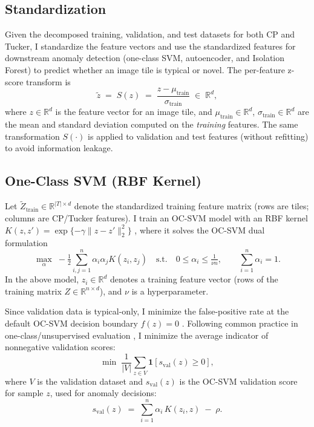 \documentclass[11pt]{article}
\begin{document}
\subsection{Standardization}

Given the decomposed training, validation, and test datasets for both CP and Tucker, I standardize the feature vectors and use the standardized features for downstream anomaly detection (one-class SVM, autoencoder, and Isolation Forest) to predict whether an image tile is typical or novel. The per-feature z-score transform is
\[
\tilde{z} \;=\; S(z) \;=\; \frac{z - \mu_{\text{train}}}{\sigma_{\text{train}}} \;\in\; \mathbb{R}^{d},
\]
where \(z\in\mathbb{R}^{d}\) is the feature vector for an image tile, and \(\mu_{\text{train}}\in\mathbb{R}^{d}\), \(\sigma_{\text{train}}\in\mathbb{R}^{d}\) are the mean and standard deviation computed on the \emph{training} features. The same transformation \(S(\cdot)\) is applied to validation and test features (without refitting) to avoid information leakage.

\subsection{One-Class SVM (RBF Kernel)}

Let \(\tilde{Z}_{\text{train}}\in\mathbb{R}^{|T|\times d}\) denote the standardized training feature matrix (rows are tiles; columns are CP/Tucker features). I train an OC-SVM model with an RBF kernel \(K(z,z')=\exp\{-\gamma\lVert z-z'\rVert_2^2\}\) \citep{Scholkopf2001,TaxDuin2004}, where it solves the OC-SVM dual formulation
\[
\max_{\alpha}\; -\tfrac{1}{2} \sum_{i,j=1}^{n} \alpha_i \alpha_j K(z_i, z_j)
\quad \text{s.t.} \quad
0 \leq \alpha_i \leq \tfrac{1}{\nu n}, \qquad
\sum_{i=1}^{n} \alpha_i = 1.
\]
In the above model, \(z_i \in \mathbb{R}^{d}\) denotes a training feature vector (rows of the training matrix \(Z\in\mathbb{R}^{n\times d}\)), and \(\nu\) is a hyperparameter.

\noindent Since validation data is typical-only, I minimize the false-positive rate at the default OC-SVM decision boundary \(f(z)=0\) \citep{Scholkopf2001,TaxDuin2004}. Following common practice in one-class/unsupervised evaluation \citep{Chandola2009,Campos2016,Ruff2021}, I minimize the average indicator of nonnegative validation scores:
\[
\min \; \frac{1}{|V|} \sum_{z \in V} \mathbf{1}\!\left[ s_{\text{val}}(z) \geq 0 \right],
\]
where \(V\) is the validation dataset and \(s_{\text{val}}(z)\) is the OC-SVM validation score for sample \(z\), used for anomaly decisions:
\[
s_{\text{val}}(z) \;=\; \sum_{i=1}^{n} \alpha_i\, K(z_i, z) \;-\; \rho.
\]
\end{document}
